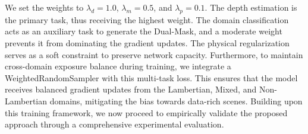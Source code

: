 We set the weights to $\lambda_{d} = 1.0$, $\lambda_{m} = 0.5$, and $\lambda_{p} = 0.1$. The depth estimation is the primary task, thus receiving the highest weight. The domain classification acts as an auxiliary task to generate the Dual-Mask, and a moderate weight prevents it from dominating the gradient updates. The physical regularization serves as a soft constraint to preserve network capacity. Furthermore, to maintain cross-domain exposure balance during training, we integrate a WeightedRandomSampler with this multi-task loss. This ensures that the model receives balanced gradient updates from the Lambertian, Mixed, and Non-Lambertian domains, mitigating the bias towards data-rich scenes. Building upon this training framework, we now proceed to empirically validate the proposed approach through a comprehensive experimental evaluation.
